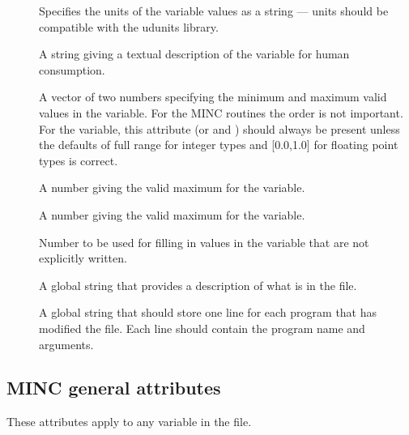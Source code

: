 \begin{description}
   \item [] Specifies the units of the variable values
      as a string --- units should be compatible with the udunits
      library.
   \item [] A string giving a textual description of
      the variable for human consumption.
   \item [] A vector of two numbers specifying the
      minimum and maximum valid values in the variable. For the MINC
      routines the order is not important. For the 
      variable, this attribute (or  and
      ) should always be present unless the
      defaults of full range for integer types and [0.0,1.0] for floating
      point types is correct.
   \item [] A number giving the valid maximum for
      the variable.
   \item [] A number giving the valid maximum for
      the variable.
   \item [] Number to be used for filling in values in
      the variable that are not explicitly written.
   \item [] A global string that provides a description
      of what is in the file.
   \item [] A global string that should store one line
      for each program that has modified the file. Each line should
      contain the program name and arguments.
\end{description}

\subsection{MINC general attributes}

These attributes apply to any variable in the file. 

